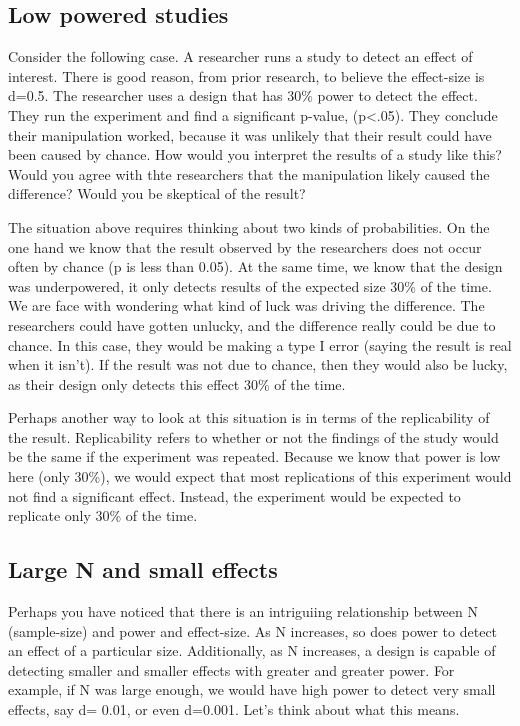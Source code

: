 \documentclass[
]{book}
\begin{document}
\hypertarget{low-powered-studies}{%
\subsection{Low powered studies}\label{low-powered-studies}}

Consider the following case. A researcher runs a study to detect an effect of interest. There is good reason, from prior research, to believe the effect-size is d=0.5. The researcher uses a design that has 30\% power to detect the effect. They run the experiment and find a significant p-value, (p\textless.05). They conclude their manipulation worked, because it was unlikely that their result could have been caused by chance. How would you interpret the results of a study like this? Would you agree with thte researchers that the manipulation likely caused the difference? Would you be skeptical of the result?

The situation above requires thinking about two kinds of probabilities. On the one hand we know that the result observed by the researchers does not occur often by chance (p is less than 0.05). At the same time, we know that the design was underpowered, it only detects results of the expected size 30\% of the time. We are face with wondering what kind of luck was driving the difference. The researchers could have gotten unlucky, and the difference really could be due to chance. In this case, they would be making a type I error (saying the result is real when it isn't). If the result was not due to chance, then they would also be lucky, as their design only detects this effect 30\% of the time.

Perhaps another way to look at this situation is in terms of the replicability of the result. Replicability refers to whether or not the findings of the study would be the same if the experiment was repeated. Because we know that power is low here (only 30\%), we would expect that most replications of this experiment would not find a significant effect. Instead, the experiment would be expected to replicate only 30\% of the time.

\hypertarget{large-n-and-small-effects}{%
\subsection{Large N and small effects}\label{large-n-and-small-effects}}

Perhaps you have noticed that there is an intriguiing relationship between N (sample-size) and power and effect-size. As N increases, so does power to detect an effect of a particular size. Additionally, as N increases, a design is capable of detecting smaller and smaller effects with greater and greater power. For example, if N was large enough, we would have high power to detect very small effects, say d= 0.01, or even d=0.001. Let's think about what this means.
\end{document}
